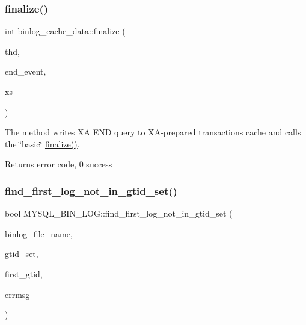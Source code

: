 \subsubsection{\texorpdfstring{finalize()}{finalize()}\hspace{0.1cm}{\footnotesize\ttfamily [2/2]}}
{\footnotesize\ttfamily int binlog\+\_\+cache\+\_\+data\+::finalize (\begin{DoxyParamCaption}\item[{T\+HD $\ast$}]{thd,  }\item[{\mbox{\hyperlink{classLog__event}{Log\+\_\+event}} $\ast$}]{end\+\_\+event,  }\item[{\mbox{\hyperlink{classXID__STATE}{X\+I\+D\+\_\+\+S\+T\+A\+TE}} $\ast$}]{xs }\end{DoxyParamCaption})}

The method writes XA E\+ND query to XA-\/prepared transaction\textquotesingle{}s cache and calls the \char`\"{}basic\char`\"{} \mbox{\hyperlink{group__Binary__Log_ga3367fa8c1daced18065f6b9dea5385fe}{finalize()}}.

\begin{DoxyReturn}{Returns}
error code, 0 success 
\end{DoxyReturn}
\mbox{\label{group__Binary__Log_gab8925923df0bf9cd07f7fcaf45f8db16}} 
\subsubsection{\texorpdfstring{find\+\_\+first\+\_\+log\+\_\+not\+\_\+in\+\_\+gtid\+\_\+set()}{find\_first\_log\_not\_in\_gtid\_set()}}
{\footnotesize\ttfamily bool M\+Y\+S\+Q\+L\+\_\+\+B\+I\+N\+\_\+\+L\+O\+G\+::find\+\_\+first\+\_\+log\+\_\+not\+\_\+in\+\_\+gtid\+\_\+set (\begin{DoxyParamCaption}\item[{char $\ast$}]{binlog\+\_\+file\+\_\+name,  }\item[{const \mbox{\hyperlink{classGtid__set}{Gtid\+\_\+set}} $\ast$}]{gtid\+\_\+set,  }\item[{\mbox{\hyperlink{structGtid}{Gtid}} $\ast$}]{first\+\_\+gtid,  }\item[{const char $\ast$$\ast$}]{errmsg }\end{DoxyParamCaption})}

